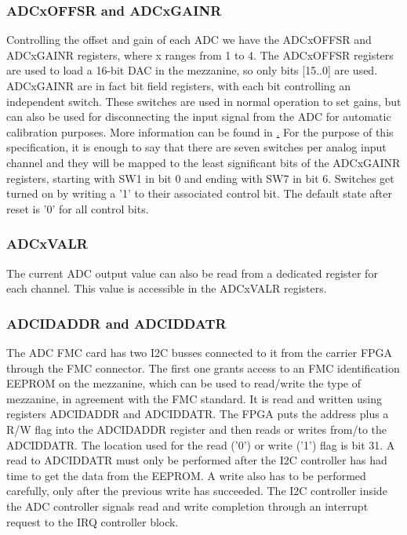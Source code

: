 \documentclass{article}
\begin{document}
\subsubsection{ADCxOFFSR and ADCxGAINR}
\label{sssec:gain_offs}
Controlling the offset and gain of each ADC we have the ADCxOFFSR and ADCxGAINR registers, where x ranges from 1 to 4. The ADCxOFFSR registers are used to load a 16-bit DAC in the mezzanine, so only bits [15..0] are used. ADCxGAINR are in fact bit field registers, with each bit controlling an independent switch. These switches are used in normal operation to set gains, but can also be used for disconnecting the input signal from the ADC for automatic calibration purposes. More information can be found in \href{http://www.ohwr.org/projects/fmc-adc-100m14b4cha}. For the purpose of this specification, it is enough to say that there are seven switches per analog input channel and they will be mapped to the least significant bits of the ADCxGAINR registers, starting with SW1 in bit 0 and ending with SW7 in bit 6. Switches get turned on by writing a '1' to their associated control bit. The default state after reset is '0' for all control bits.

\subsubsection{ADCxVALR}
The current ADC output value can also be read from a dedicated register for each channel. This value is accessible in the ADCxVALR registers.

\subsubsection{ADCIDADDR and ADCIDDATR}
The ADC FMC card has two I2C busses connected to it from the carrier FPGA through the FMC connector. The first one grants access to an FMC identification EEPROM on the mezzanine, which can be used to read/write the type of mezzanine, in agreement with the FMC standard. It is read and written using registers ADCIDADDR and ADCIDDATR. The FPGA puts the address plus a R/W flag into the ADCIDADDR register and then reads or writes from/to the ADCIDDATR. The location used for the read ('0') or write ('1') flag is bit 31. A read to ADCIDDATR must only be performed after the I2C controller has had time to get the data from the EEPROM. A write also has to be performed carefully, only after the previous write has succeeded. The I2C controller inside the ADC controller signals read and write completion through an interrupt request to the IRQ controller block. 
\end{document}
